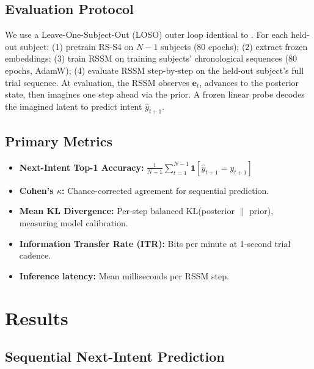 \documentclass[11pt,a4paper]{article}
\begin{document}
\subsection{Evaluation Protocol}
We use a Leave-One-Subject-Out (LOSO) outer loop identical to \cite{woodall2026rss4}. For each held-out subject: (1) pretrain RS-S4 on $N-1$ subjects (80 epochs); (2) extract frozen embeddings; (3) train RSSM on training subjects' chronological sequences (80 epochs, AdamW); (4) evaluate RSSM step-by-step on the held-out subject's full trial sequence. At evaluation, the RSSM observes $\mathbf{e}_t$, advances to the posterior state, then imagines one step ahead via the prior. A frozen linear probe decodes the imagined latent to predict intent $\hat{y}_{t+1}$.

\subsection{Primary Metrics}
\begin{itemize}
    \item \textbf{Next-Intent Top-1 Accuracy:} $\frac{1}{N-1}\sum_{t=1}^{N-1} \mathbf{1}[\hat{y}_{t+1} = y_{t+1}]$
    \item \textbf{Cohen's $\kappa$:} Chance-corrected agreement for sequential prediction.
    \item \textbf{Mean KL Divergence:} Per-step balanced KL(posterior $\|$ prior), measuring model calibration.
    \item \textbf{Information Transfer Rate (ITR):} Bits per minute at 1-second trial cadence.
    \item \textbf{Inference latency:} Mean milliseconds per RSSM step.
\end{itemize}

\section{Results}

\subsection{Sequential Next-Intent Prediction}
\end{document}
